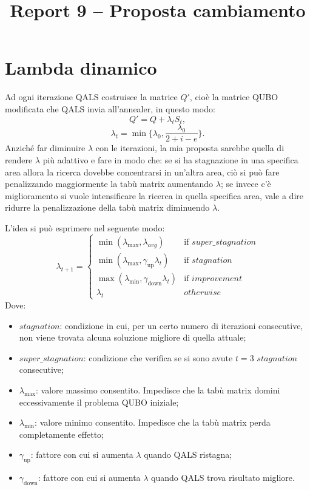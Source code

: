 \documentclass[12pt, letterpaper]{article}
\title{Report 9 -- Proposta cambiamento}
\begin{document}
\maketitle

\newpage

\section{Lambda dinamico}
Ad ogni iterazione QALS costruisce la matrice \(Q'\), cioè la matrice QUBO modificata che QALS invia all'annealer, in questo modo:
\[ 
Q' = Q + \lambda_t S_t,
\]
\[
\lambda_t = \min \{ \lambda_0, \frac{\lambda_0}{2 + i - e}\}.
\]
Anziché far diminuire $\lambda$ con le iterazioni, la mia proposta sarebbe quella di rendere $\lambda$ più adattivo e fare in modo che:
se si ha stagnazione in una specifica area allora la ricerca dovebbe concentrarsi in un'altra area, ciò si può fare penalizzando 
maggiormente la tabù matrix aumentando $\lambda$; se invece c'è miglioramento si vuole intensificare la ricerca in quella specifica area, 
vale a dire ridurre la penalizzazione della tabù matrix diminuendo $\lambda$.

L'idea si può esprimere nel seguente modo:
\begin{equation}
\lambda_{t+1} = 
\begin{cases}
    \min(\lambda_{\max}, \lambda_{avg}) & \text{if \(super\_stagnation\)} \\
    \min(\lambda_{\max}, \gamma_{\text{up}} \lambda_t) & \text{if \(stagnation\)} \\
    \max(\lambda_{\min}, \gamma_{\text{down}} \lambda_t) & \text{if \(improvement\)} \\
    \lambda_t & \text{\(otherwise\)}
\end{cases}
\label{eq:lambda_update}
\end{equation}
Dove:
\begin{itemize}
    \item \(stagnation\): condizione in cui, per un certo numero di iterazioni consecutive, non viene trovata alcuna soluzione migliore di quella attuale;
    \item \(super\_stagnation\): condizione che verifica se si sono avute \(t=3\) \(stagnation\) consecutive;
    \item $\lambda_{\max}$: valore massimo consentito. Impedisce che la tabù matrix domini eccessivamente il problema QUBO iniziale;
    \item $\lambda_{\min}$: valore minimo consentito. Impedisce che la tabù matrix perda completamente effetto;
    \item $\gamma_{\text{up}}$: fattore con cui si aumenta $\lambda$ quando QALS ristagna;
    \item $\gamma_{\text{down}}$: fattore con cui si aumenta $\lambda$ quando QALS trova risultato migliore.
\end{itemize}
\end{document}
